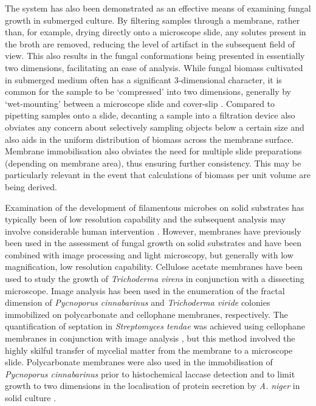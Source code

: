 The system has also been demonstrated as an effective means of examining fungal growth in submerged culture. By filtering samples through a membrane, rather than, for example, drying directly onto a microscope slide, any solutes present in the broth are removed, reducing the level of artifact in the subsequent field of view. This also results in the fungal conformations being presented in essentially two dimensions, facilitating an ease of analysis. While fungal biomass cultivated in submerged medium often has a significant 3-dimensional character, it is common for the sample to be \lq compressed' into two dimensions, generally by \lq wet-mounting' between a microscope slide and cover-slip \cite{amanullah2000,li2000,papagianni2002,bhargava2003}. Compared to pipetting samples onto a slide, decanting a sample into a filtration device also obviates any concern about selectively sampling objects below a certain size and also aids in the uniform distribution of biomass across the membrane surface. Membrane immobilisation also obviates the need for multiple slide preparations (depending on membrane area), thus ensuring further consistency. This may be particularly relevant in the event that calculations of biomass per unit volume are being derived.

Examination of the development of filamentous microbes on solid substrates has typically been of low resolution capability and the subsequent analysis may involve considerable human intervention \cite{larralde-corona1997}. However, membranes have previously been used in the assessment of fungal growth on solid substrates and have been combined with image processing and light microscopy, but generally with low magnification, low resolution capability. Cellulose acetate membranes have been used to study the growth of \emph{Trichoderma virens} \cite{cross2004} in conjunction with a dissecting microscope. Image analysis has been used in the enumeration of the fractal dimension of \emph{Pycnoporus cinnabarinus} \cite{jones1997} and \emph{Trichoderma viride} \cite{hitchcock1996} colonies immobilized on polycarbonate and cellophane membranes, respectively. The quantification of septation in \emph{Streptomyces tendae} was achieved using cellophane membranes in conjunction with image analysis \cite{reichl1990}, but this method involved the highly skilful transfer of mycelial matter from the membrane to a microscope slide. Polycarbonate membranes were also used in the immobilisation of \emph{Pycnoporus cinnabarinus} prior to histochemical laccase detection \cite{jones1999} and to limit growth to two dimensions in the localisation of protein secretion by \emph{A. niger} in solid culture \cite{wosten1991}.

